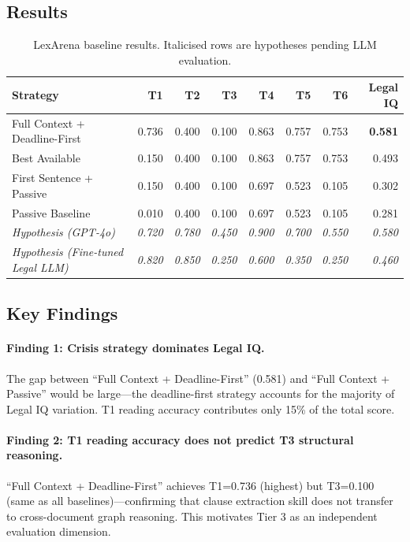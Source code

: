 \documentclass[11pt]{article}
\begin{document}
\subsection{Results}

\begin{table}[h]
\centering
\small
\begin{tabular}{lrrrrrr r}
\toprule
\textbf{Strategy} & \textbf{T1} & \textbf{T2} & \textbf{T3} & \textbf{T4} & \textbf{T5} & \textbf{T6} & \textbf{Legal IQ} \\
\midrule
Full Context + Deadline-First & 0.736 & 0.400 & 0.100 & 0.863 & 0.757 & 0.753 & \textbf{0.581} \\
Best Available & 0.150 & 0.400 & 0.100 & 0.863 & 0.757 & 0.753 & 0.493 \\
First Sentence + Passive & 0.150 & 0.400 & 0.100 & 0.697 & 0.523 & 0.105 & 0.302 \\
Passive Baseline & 0.010 & 0.400 & 0.100 & 0.697 & 0.523 & 0.105 & 0.281 \\
\midrule
\textit{Hypothesis (GPT-4o)} & \textit{0.720} & \textit{0.780} & \textit{0.450} & \textit{0.900} & \textit{0.700} & \textit{0.550} & \textit{0.580} \\
\textit{Hypothesis (Fine-tuned Legal LLM)} & \textit{0.820} & \textit{0.850} & \textit{0.250} & \textit{0.600} & \textit{0.350} & \textit{0.250} & \textit{0.460} \\
\bottomrule
\end{tabular}
\caption{LexArena baseline results. Italicised rows are hypotheses pending LLM evaluation.}
\label{tab:results}
\end{table}

\subsection{Key Findings}

\paragraph{Finding 1: Crisis strategy dominates Legal IQ.}
The gap between ``Full Context + Deadline-First'' (0.581) and ``Full Context + Passive'' would be large---the deadline-first strategy accounts for the majority of Legal IQ variation. T1 reading accuracy contributes only 15\% of the total score.

\paragraph{Finding 2: T1 reading accuracy does not predict T3 structural reasoning.}
``Full Context + Deadline-First'' achieves T1=0.736 (highest) but T3=0.100 (same as all baselines)---confirming that clause extraction skill does not transfer to cross-document graph reasoning. This motivates Tier 3 as an independent evaluation dimension.
\end{document}

